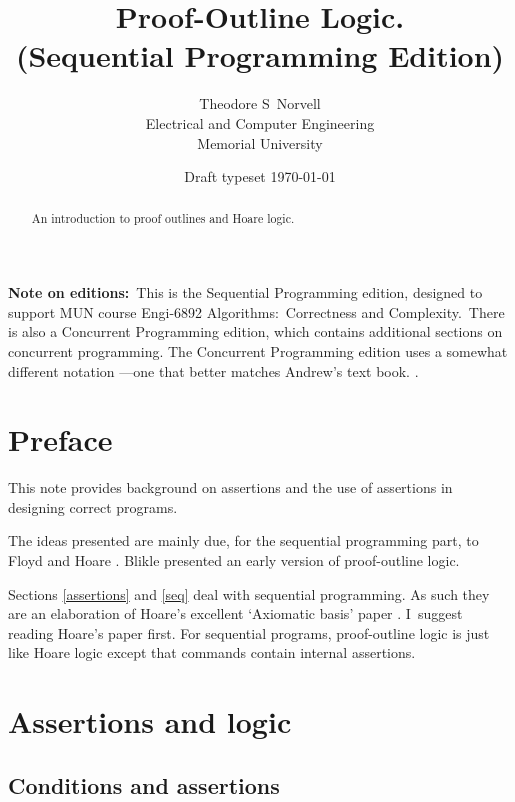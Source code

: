 \documentclass[muchmore,11pt]{article}%
\begin{document}
\title{Proof-Outline Logic.\\(Sequential Programming Edition)}
\author{Theodore S\ Norvell\\Electrical and Computer Engineering\\Memorial University}
\date{Draft typeset
\today
}
\maketitle

\begin{abstract}
An introduction to proof outlines and Hoare logic.

\end{abstract}

\textbf{Note on editions:}\ This is the Sequential Programming edition,
designed to support MUN course Engi-6892 Algorithms:\ Correctness and
Complexity.\ There is also a Concurrent Programming edition, which contains
additional sections on concurrent programming. The Concurrent Programming
edition uses a somewhat different notation ---one that better matches Andrew's
text book. \cite{Andrews2000}.

\section{Preface}

This note provides background on assertions and the use of assertions in
designing correct programs.

The ideas presented are mainly due, for the sequential programming part, to
Floyd \cite{Floyd670} and Hoare \cite{Hoare690}. Blikle \cite{Blikle1979}
presented an early version of proof-outline logic.

Sections \ref{assertions} and \ref{seq} deal with sequential programming. As
such they are an elaboration of Hoare's excellent `Axiomatic basis' paper
\cite{Hoare690}. I\ suggest reading Hoare's paper first. For sequential
programs, proof-outline logic is just like Hoare logic except that commands
contain internal assertions.

\section{Assertions and logic\label{assertions}}

\subsection{Conditions and assertions}
\end{document}
